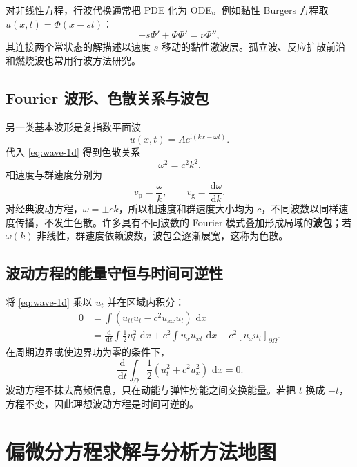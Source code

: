 \documentclass[cn,hazy,blue,11pt,normal]{elegantnote}
\numberwithin{equation}{section}
\newcommand{\dd}{\,\mathrm d}
\begin{document}
对非线性方程，行波代换通常把 PDE 化为 ODE。例如黏性 Burgers 方程取 $u(x,t)=\Phi(x-st)$：
\begin{equation}
 -s\Phi'+\Phi\Phi'=\nu\Phi'',
\end{equation}
其连接两个常状态的解描述以速度 $s$ 移动的黏性激波层。孤立波、反应扩散前沿和燃烧波也常用行波方法研究。

\subsection{Fourier 波形、色散关系与波包}

另一类基本波形是复指数平面波
\begin{equation}
 u(x,t)=A e^{\mathrm i(kx-\omega t)}.
\end{equation}
代入 \eqref{eq:wave-1d} 得到色散关系
\begin{equation}
 \boxed{\omega^2=c^2k^2.}
\end{equation}
相速度与群速度分别为
\begin{equation}
 v_{\mathrm p}=\frac\omega k,
 \qquad v_{\mathrm g}=\frac{\dd\omega}{\dd k}.
\end{equation}
对经典波动方程，$\omega=\pm ck$，所以相速度和群速度大小均为 $c$，不同波数以同样速度传播，不发生色散。许多具有不同波数的 Fourier 模式叠加形成局域的\textbf{波包}；若 $\omega(k)$ 非线性，群速度依赖波数，波包会逐渐展宽，这称为色散。

\subsection{波动方程的能量守恒与时间可逆性}

将 \eqref{eq:wave-1d} 乘以 $u_t$ 并在区域内积分：
\begin{align}
 0&=\int(u_{tt}u_t-c^2u_{xx}u_t)\,\dd x\\
 &=\frac{\dd}{\dd t}\int\frac12u_t^2\,\dd x
 +c^2\int u_xu_{xt}\,\dd x
 -c^2[u_xu_t]_{\partial\Omega}.
\end{align}
在周期边界或使边界功为零的条件下，
\begin{equation}
 \boxed{\frac{\dd}{\dd t}
 \int_\Omega\frac12(u_t^2+c^2u_x^2)\,\dd x=0.}
\end{equation}
波动方程不抹去高频信息，只在动能与弹性势能之间交换能量。若把 $t$ 换成 $-t$，方程不变，因此理想波动方程是时间可逆的。

\section{偏微分方程求解与分析方法地图}
\end{document}
